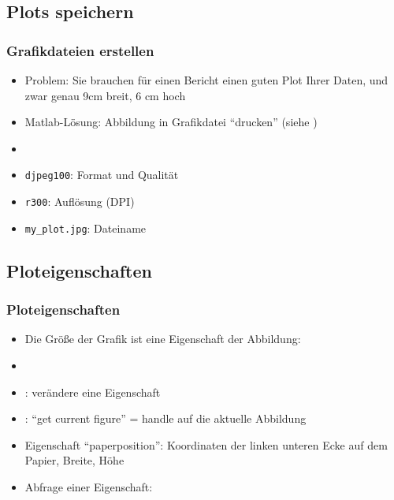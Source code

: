       \subsection{Plots speichern}
      \begin{frame}
          \frametitle{Grafikdateien erstellen}
          \begin{itemize}
              \item Problem: Sie brauchen für einen Bericht einen guten Plot Ihrer Daten, und zwar genau 9cm breit, 6 cm hoch
              \item Matlab-Lösung: Abbildung in Grafikdatei ``drucken'' (siehe )
              \item {}
              \item \texttt{djpeg100}: Format und Qualität
              \item \texttt{r300}: Auflösung (DPI)
              \item \texttt{my\_plot.jpg}: Dateiname
          \end{itemize}
      \end{frame}

      \subsection{Ploteigenschaften}
      \begin{frame}
          \frametitle{Ploteigenschaften}
          \begin{itemize}
              \item Die Größe der Grafik ist eine Eigenschaft der Abbildung:
              \item {} 
              \item {}: verändere eine Eigenschaft
              \item {}: ``get current figure'' = handle auf die aktuelle Abbildung
              \item Eigenschaft ``paperposition'': Koordinaten der linken unteren Ecke auf dem Papier, Breite, Höhe
              \item Abfrage einer Eigenschaft: 
          \end{itemize}
      \end{frame}

